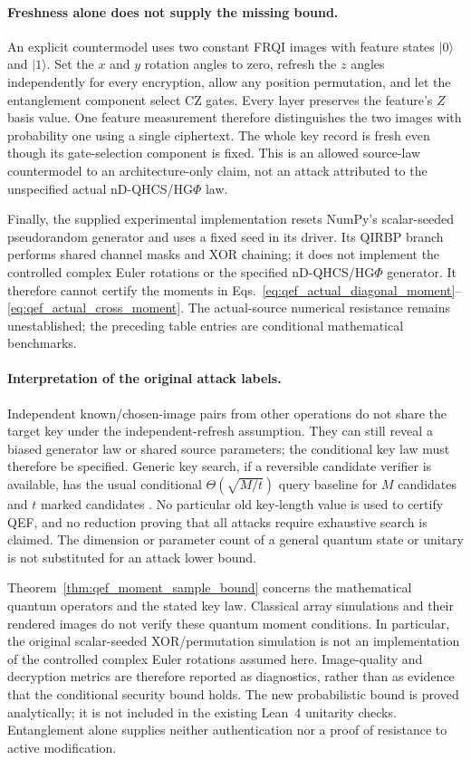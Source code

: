 \documentclass[11pt,a4paper]{article}
\begin{document}
{{\paragraph{Freshness alone does not supply the missing bound.}
An explicit countermodel uses two constant FRQI images with feature
states $|0\rangle$ and $|1\rangle$. Set the $x$ and $y$ rotation angles
to zero, refresh the $z$ angles independently for every encryption,
allow any position permutation, and let the entanglement component
select CZ gates. Every layer preserves the feature's $Z$ basis value.
One feature measurement therefore distinguishes the two images with
probability one using a single ciphertext. The whole key record is
fresh even though its gate-selection component is fixed. This is an
allowed source-law countermodel to an architecture-only claim, not an
attack attributed to the unspecified actual nD-QHCS/HG$\Phi$ law.

Finally, the supplied experimental implementation resets NumPy's
scalar-seeded pseudorandom generator and uses a fixed seed in its
driver. Its QIRBP branch performs shared channel masks and XOR chaining;
it does not implement the controlled complex Euler rotations or the
specified nD-QHCS/HG$\Phi$ generator. It therefore cannot certify the
moments in Eqs.~\eqref{eq:qef_actual_diagonal_moment}--
\eqref{eq:qef_actual_cross_moment}. The actual-source numerical
resistance remains unestablished; the preceding table entries are
conditional mathematical benchmarks.
\par}


\paragraph{Interpretation of the original attack labels.}
Independent known/chosen-image pairs from other operations do not
share the target key under the independent-refresh assumption. They
can still reveal a biased generator law or shared source parameters;
the conditional key law must therefore be specified. Generic key
search, if a reversible candidate verifier is available, has the
usual conditional $\Theta(\sqrt{M/t})$ query baseline for $M$ candidates
and $t$ marked candidates \cite{GDO,Boyer1998QEF,Zalka1999QEF}.
No particular old key-length value is used to certify QEF, and no
reduction proving that all attacks require exhaustive search is
claimed. The dimension or parameter count of a general quantum state
or unitary is not substituted for an attack lower bound.

Theorem~\ref{thm:qef_moment_sample_bound} concerns the mathematical
quantum operators and the stated key law. Classical array simulations
and their rendered images do not verify these quantum moment
conditions. In particular, the original scalar-seeded XOR/permutation
simulation is not an implementation of the controlled complex
Euler rotations assumed here. Image-quality and decryption metrics
are therefore reported as diagnostics, rather than as evidence that
the conditional security bound holds. The new probabilistic bound
is proved analytically; it is not included in the existing Lean~4
unitarity checks. Entanglement alone supplies neither authentication
nor a proof of resistance to active modification.
\par}
\clearpage
\end{document}
